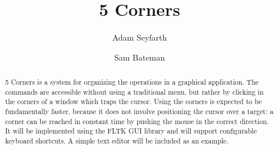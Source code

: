 \documentclass[12pt]{article}
\title{5 Corners}
\author{Adam Seyfarth \and Sam Bateman}
\date{}
\begin{document}
\maketitle

\begin{abstract}
5 Corners is a system for organizing the operations in a graphical
application.  The commands are accessible without using a traditional menu,
but rather by clicking in the corners of a window which traps the cursor.
Using the corners is expected to be fundamentally faster, because it does not
involve positioning the cursor over a target: a corner can be reached in
constant time by pushing the mouse in the correct direction.  It will be
implemented using the FLTK GUI library and will support configurable keyboard
shortcuts.  A simple text editor will be included as an example.
\end{abstract}
\end{document}
